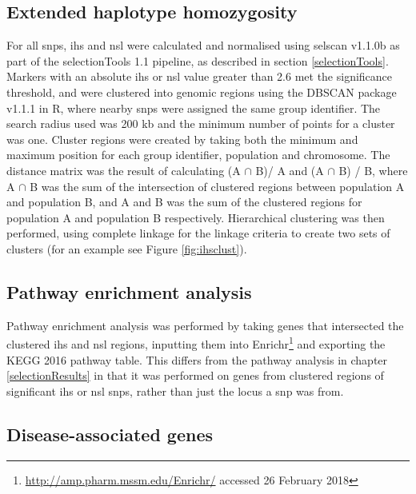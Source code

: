 \documentclass[]{report}
\begin{document}
\subsection{Extended haplotype homozygosity}\label{haplocluster}

For all \glspl{snp}, \gls{ihs} and \gls{nsl} were calculated and
normalised using selscan v1.1.0b \citep{Szpiech2014} as part of the
selectionTools 1.1 \citep{Cadzow2014} pipeline, as described in section
\ref{selectionTools}. Markers with an absolute \gls{ihs} or \gls{nsl}
value greater than 2.6 met the significance threshold, and were
clustered into genomic regions using the DBSCAN package v1.1.1
\citep{dbscanref} in R, where nearby \glspl{snp} were assigned the same
group identifier. The search radius used was 200 kb and the minimum
number of points for a cluster was one. Cluster regions were created by
taking both the minimum and maximum position for each group identifier,
population and chromosome. The distance matrix was the result of
calculating (A \(\cap\) B)/ A and (A \(\cap\) B) / B, where A \(\cap\) B
was the sum of the intersection of clustered regions between population
A and population B, and A and B was the sum of the clustered regions for
population A and population B respectively. Hierarchical clustering was
then performed, using complete linkage for the linkage criteria to
create two sets of clusters (for an example see Figure
\ref{fig:ihsclust}).

\subsection{Pathway enrichment
analysis}\label{pathway-enrichment-analysis-1}

Pathway enrichment analysis was performed by taking genes that
intersected the clustered \gls{ihs} and \gls{nsl} regions, inputting
them into Enrichr\footnote{\url{http://amp.pharm.mssm.edu/Enrichr/}
  accessed 26 February 2018} \citep{Chen2013b, Kuleshov2016} and
exporting the KEGG 2016 pathway table. This differs from the pathway
analysis in chapter \ref{selectionResults} in that it was performed on
genes from clustered regions of significant \gls{ihs} or \gls{nsl}
\glspl{snp}, rather than just the locus a \gls{snp} was from.

\subsection{Disease-associated genes}\label{disease-associated-genes}
\end{document}

